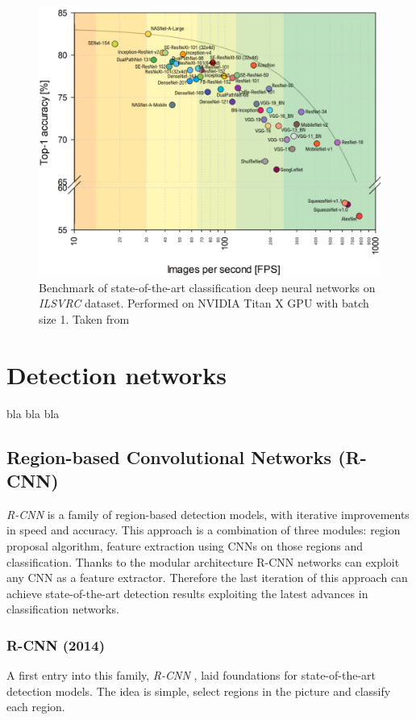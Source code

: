 \begin{figure}
    \includegraphics[width=\textwidth]{img/fps_comp}
    \caption{Benchmark of state-of-the-art classification deep neural networks on \textit{ILSVRC} dataset. Performed on NVIDIA
Titan X GPU with batch size 1. Taken from \cite[fig. 3]{bib:cnnbenchmark}}
    \label{fig:cnnbenchmark}
\end{figure}



\section{Detection networks}
\label{sec:detnets}
bla bla bla

\subsection{Region-based Convolutional Networks (R-CNN)}
\textit{R-CNN} is a family of region-based detection models, with iterative improvements in speed and accuracy. This approach is a combination of three modules: region proposal algorithm, feature extraction using CNNs on those regions and classification. Thanks to the modular architecture R-CNN networks can exploit any CNN as a feature extractor. Therefore the last iteration of this approach can achieve state-of-the-art detection results exploiting the latest advances in classification networks.

\subsubsection{R-CNN (2014)}
A first entry into this family, \textit{R-CNN} \cite{bib:rcnn}, laid foundations for state-of-the-art detection models. The idea is simple, select regions in the picture and classify each region.

